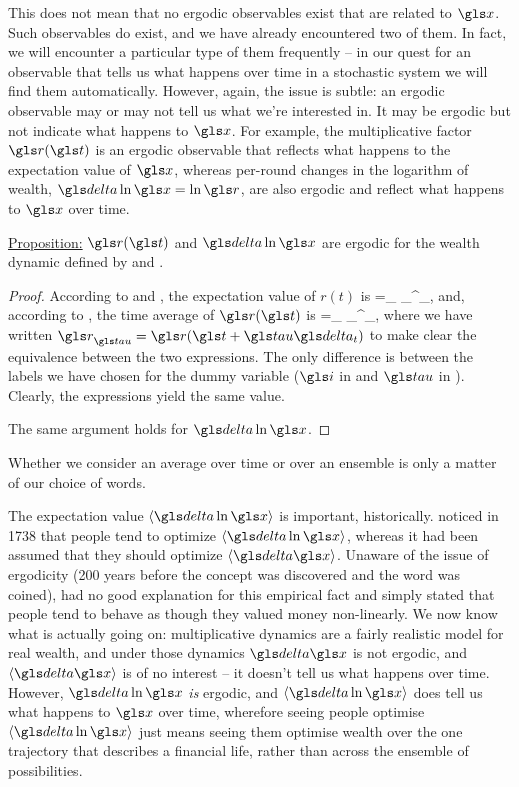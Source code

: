 This does not mean that no ergodic observables exist that are related
to $\x$. Such observables do exist, and
we have already encountered two of them. In fact, we will encounter a particular type
of them frequently -- in our quest for an observable that tells us what happens over
time in a stochastic system we will find them automatically. However, again, the issue
is subtle: an ergodic observable may or may not tell  us what we're interested in.
It may be ergodic but not indicate what happens to $\x$. For example, 
the multiplicative factor $\gr(\t)$ is an 
ergodic observable that reflects what happens to the expectation value of $\x$, 
whereas per-round changes in the logarithm of wealth, $\d \ln \x = \ln \gr$, are also ergodic 
and reflect what happens to $\x$ over time.

\vspace{.3cm}
\underline{Proposition:} $\gr(\t)$ and $\d \ln \x$  are ergodic for the wealth dynamic defined by  and .

\begin{proof}

According to  and , the expectation value of $r(t)$ is
\be
\ave{\gr}=\lim_{\N\to\infty}  \sum_\gi^\N \gr_\gi,
\ee
and, according to , the time average of $\gr(\t)$ is
\be
\tave{\gr}=\lim_{\T\to\infty}  \sum_\gtau^\T \gr_\gtau,
\ee
where we have written $\gr_\gtau = \gr(\t+\gtau\dt)$ to make clear the equivalence between the two expressions. The only difference is between the labels we have chosen
for the dummy variable ($\gi$ in  and $\gtau$ in ). Clearly, the 
expressions yield the same value. 

The same argument holds for $\d \ln \x$.
\end{proof}

Whether we consider  an average over 
time or over an ensemble is only a matter of our choice of words. 

The expectation value $\ave{\d \ln \x}$ is important, historically.  noticed in 
1738 \cite{Bernoulli1738} that people tend to
optimize $\ave{\d \ln \x}$, whereas it had been assumed that they should optimize $\ave{\d \x}$. 
Unaware of the issue of ergodicity (200 years before the concept was discovered 
and the word was coined),  had no good explanation for this 
empirical fact and simply stated that people tend to behave as though they valued
money non-linearly. We now know what is actually going on: multiplicative dynamics
are a fairly realistic model for real wealth, and under those dynamics
$\d \x$ is not ergodic, 
and $\ave{\d \x}$ is of no interest -- it doesn't tell us what happens over time. However,
$\d \ln \x$ {\it is} ergodic, and $\ave{\d \ln \x}$ does tell us what happens to $\x$ over time, 
wherefore seeing people optimise $\ave{\d \ln \x}$ just means seeing them optimise wealth 
over the one trajectory that describes a financial life, rather than across the ensemble of possibilities.

